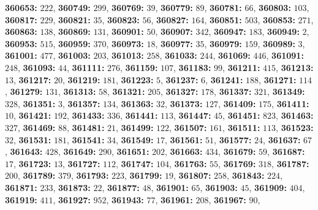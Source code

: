 \textsf{\bfseries 360653:} $222$, \textsf{\bfseries 360749:} $299$, \textsf{\bfseries 360769:} $39$, \textsf{\bfseries 360779:} $89$, \textsf{\bfseries 360781:} $66$, \textsf{\bfseries 360803:} $103$, \textsf{\bfseries 360817:} $229$, \textsf{\bfseries 360821:} $35$, \textsf{\bfseries 360823:} $56$, \textsf{\bfseries 360827:} $164$, \textsf{\bfseries 360851:} $503$, \textsf{\bfseries 360853:} $271$, \textsf{\bfseries 360863:} $138$, \textsf{\bfseries 360869:} $131$, \textsf{\bfseries 360901:} $50$, \textsf{\bfseries 360907:} $342$, \textsf{\bfseries 360947:} $183$, \textsf{\bfseries 360949:} $2$, \textsf{\bfseries 360953:} $515$, \textsf{\bfseries 360959:} $370$, \textsf{\bfseries 360973:} $18$, \textsf{\bfseries 360977:} $35$, \textsf{\bfseries 360979:} $159$, \textsf{\bfseries 360989:} $3$, \textsf{\bfseries 361001:} $477$, \textsf{\bfseries 361003:} $203$, \textsf{\bfseries 361013:} $258$, \textsf{\bfseries 361033:} $244$, \textsf{\bfseries 361069:} $446$, \textsf{\bfseries 361091:} $248$, \textsf{\bfseries 361093:} $44$, \textsf{\bfseries 361111:} $276$, \textsf{\bfseries 361159:} $107$, \textsf{\bfseries 361183:} $99$, \textsf{\bfseries 361211:} $415$, \textsf{\bfseries 361213:} $13$, \textsf{\bfseries 361217:} $20$, \textsf{\bfseries 361219:} $181$, \textsf{\bfseries 361223:} $5$, \textsf{\bfseries 361237:} $6$, \textsf{\bfseries 361241:} $188$, \textsf{\bfseries 361271:} $114$, \textsf{\bfseries 361279:} $131$, \textsf{\bfseries 361313:} $58$, \textsf{\bfseries 361321:} $205$, \textsf{\bfseries 361327:} $178$, \textsf{\bfseries 361337:} $321$, \textsf{\bfseries 361349:} $328$, \textsf{\bfseries 361351:} $3$, \textsf{\bfseries 361357:} $134$, \textsf{\bfseries 361363:} $32$, \textsf{\bfseries 361373:} $127$, \textsf{\bfseries 361409:} $175$, \textsf{\bfseries 361411:} $10$, \textsf{\bfseries 361421:} $192$, \textsf{\bfseries 361433:} $336$, \textsf{\bfseries 361441:} $113$, \textsf{\bfseries 361447:} $45$, \textsf{\bfseries 361451:} $823$, \textsf{\bfseries 361463:} $327$, \textsf{\bfseries 361469:} $88$, \textsf{\bfseries 361481:} $21$, \textsf{\bfseries 361499:} $122$, \textsf{\bfseries 361507:} $161$, \textsf{\bfseries 361511:} $113$, \textsf{\bfseries 361523:} $32$, \textsf{\bfseries 361531:} $181$, \textsf{\bfseries 361541:} $34$, \textsf{\bfseries 361549:} $17$, \textsf{\bfseries 361561:} $51$, \textsf{\bfseries 361577:} $24$, \textsf{\bfseries 361637:} $67$, \textsf{\bfseries 361643:} $428$, \textsf{\bfseries 361649:} $290$, \textsf{\bfseries 361651:} $202$, \textsf{\bfseries 361663:} $434$, \textsf{\bfseries 361679:} $59$, \textsf{\bfseries 361687:} $17$, \textsf{\bfseries 361723:} $13$, \textsf{\bfseries 361727:} $112$, \textsf{\bfseries 361747:} $104$, \textsf{\bfseries 361763:} $55$, \textsf{\bfseries 361769:} $318$, \textsf{\bfseries 361787:} $200$, \textsf{\bfseries 361789:} $379$, \textsf{\bfseries 361793:} $223$, \textsf{\bfseries 361799:} $19$, \textsf{\bfseries 361807:} $258$, \textsf{\bfseries 361843:} $224$, \textsf{\bfseries 361871:} $233$, \textsf{\bfseries 361873:} $22$, \textsf{\bfseries 361877:} $48$, \textsf{\bfseries 361901:} $65$, \textsf{\bfseries 361903:} $45$, \textsf{\bfseries 361909:} $404$, \textsf{\bfseries 361919:} $411$, \textsf{\bfseries 361927:} $952$, \textsf{\bfseries 361943:} $77$, \textsf{\bfseries 361961:} $208$, \textsf{\bfseries 361967:} $90$, 
